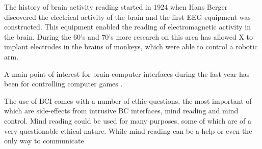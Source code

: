 The history of brain activity reading started in 1924 when Hans Berger discovered the electrical activity of the brain and the first EEG equipment was constructed. This equipment enabled the reading of electromagnetic activity in the brain. During the 60's and 70's more research on this area has allowed  X to implant electrodes in the brains of monkeys, which were able to control a robotic arm.


A main point of interest for brain-computer interfaces during the last year has been for controlling computer games . 


The use of BCI comes with a number of ethic questions, the most important of which are side-effects from intrusive BC interfaces, mind reading and mind control.
Mind reading could be used for many purposes, some of which are of a very questionable ethical nature. While mind reading can be a help or even the only way to communicate


